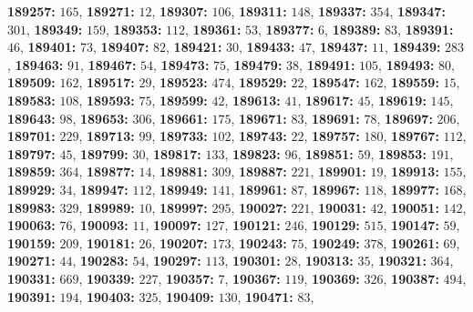 \textsf{\bfseries 189257:} $165$, \textsf{\bfseries 189271:} $12$, \textsf{\bfseries 189307:} $106$, \textsf{\bfseries 189311:} $148$, \textsf{\bfseries 189337:} $354$, \textsf{\bfseries 189347:} $301$, \textsf{\bfseries 189349:} $159$, \textsf{\bfseries 189353:} $112$, \textsf{\bfseries 189361:} $53$, \textsf{\bfseries 189377:} $6$, \textsf{\bfseries 189389:} $83$, \textsf{\bfseries 189391:} $46$, \textsf{\bfseries 189401:} $73$, \textsf{\bfseries 189407:} $82$, \textsf{\bfseries 189421:} $30$, \textsf{\bfseries 189433:} $47$, \textsf{\bfseries 189437:} $11$, \textsf{\bfseries 189439:} $283$, \textsf{\bfseries 189463:} $91$, \textsf{\bfseries 189467:} $54$, \textsf{\bfseries 189473:} $75$, \textsf{\bfseries 189479:} $38$, \textsf{\bfseries 189491:} $105$, \textsf{\bfseries 189493:} $80$, \textsf{\bfseries 189509:} $162$, \textsf{\bfseries 189517:} $29$, \textsf{\bfseries 189523:} $474$, \textsf{\bfseries 189529:} $22$, \textsf{\bfseries 189547:} $162$, \textsf{\bfseries 189559:} $15$, \textsf{\bfseries 189583:} $108$, \textsf{\bfseries 189593:} $75$, \textsf{\bfseries 189599:} $42$, \textsf{\bfseries 189613:} $41$, \textsf{\bfseries 189617:} $45$, \textsf{\bfseries 189619:} $145$, \textsf{\bfseries 189643:} $98$, \textsf{\bfseries 189653:} $306$, \textsf{\bfseries 189661:} $175$, \textsf{\bfseries 189671:} $83$, \textsf{\bfseries 189691:} $78$, \textsf{\bfseries 189697:} $206$, \textsf{\bfseries 189701:} $229$, \textsf{\bfseries 189713:} $99$, \textsf{\bfseries 189733:} $102$, \textsf{\bfseries 189743:} $22$, \textsf{\bfseries 189757:} $180$, \textsf{\bfseries 189767:} $112$, \textsf{\bfseries 189797:} $45$, \textsf{\bfseries 189799:} $30$, \textsf{\bfseries 189817:} $133$, \textsf{\bfseries 189823:} $96$, \textsf{\bfseries 189851:} $59$, \textsf{\bfseries 189853:} $191$, \textsf{\bfseries 189859:} $364$, \textsf{\bfseries 189877:} $14$, \textsf{\bfseries 189881:} $309$, \textsf{\bfseries 189887:} $221$, \textsf{\bfseries 189901:} $19$, \textsf{\bfseries 189913:} $155$, \textsf{\bfseries 189929:} $34$, \textsf{\bfseries 189947:} $112$, \textsf{\bfseries 189949:} $141$, \textsf{\bfseries 189961:} $87$, \textsf{\bfseries 189967:} $118$, \textsf{\bfseries 189977:} $168$, \textsf{\bfseries 189983:} $329$, \textsf{\bfseries 189989:} $10$, \textsf{\bfseries 189997:} $295$, \textsf{\bfseries 190027:} $221$, \textsf{\bfseries 190031:} $42$, \textsf{\bfseries 190051:} $142$, \textsf{\bfseries 190063:} $76$, \textsf{\bfseries 190093:} $11$, \textsf{\bfseries 190097:} $127$, \textsf{\bfseries 190121:} $246$, \textsf{\bfseries 190129:} $515$, \textsf{\bfseries 190147:} $59$, \textsf{\bfseries 190159:} $209$, \textsf{\bfseries 190181:} $26$, \textsf{\bfseries 190207:} $173$, \textsf{\bfseries 190243:} $75$, \textsf{\bfseries 190249:} $378$, \textsf{\bfseries 190261:} $69$, \textsf{\bfseries 190271:} $44$, \textsf{\bfseries 190283:} $54$, \textsf{\bfseries 190297:} $113$, \textsf{\bfseries 190301:} $28$, \textsf{\bfseries 190313:} $35$, \textsf{\bfseries 190321:} $364$, \textsf{\bfseries 190331:} $669$, \textsf{\bfseries 190339:} $227$, \textsf{\bfseries 190357:} $7$, \textsf{\bfseries 190367:} $119$, \textsf{\bfseries 190369:} $326$, \textsf{\bfseries 190387:} $494$, \textsf{\bfseries 190391:} $194$, \textsf{\bfseries 190403:} $325$, \textsf{\bfseries 190409:} $130$, \textsf{\bfseries 190471:} $83$, 
